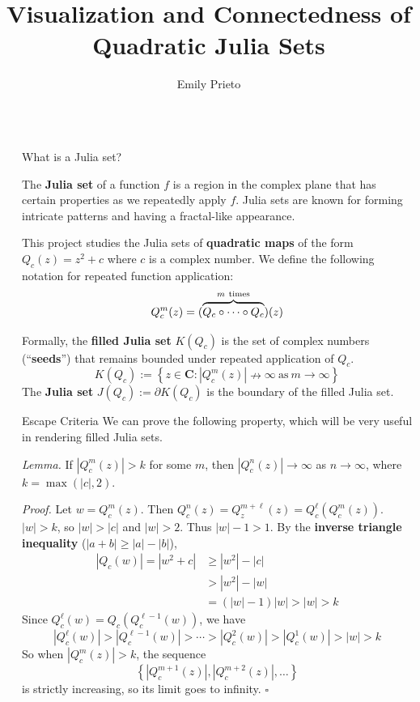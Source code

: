 \documentclass[final]{beamer}
\title{Visualization and Connectedness of %
Quadratic Julia Sets}
\author{Emily Prieto}
\newlength{\sepwidth}
\newlength{\colwidth}
\newcommand{\separatorcolumn}{\begin{column}{\sepwidth}\end{column}}
\newcommand{\setbold}{\mathbf}
\newcommand{\CC}{\setbold{C}}
\begin{document}
\begin{frame}[t]
\begin{columns}[t]
\separatorcolumn

\begin{column}{\colwidth}

	\begin{block}{What is a Julia set?}

		The \textbf{Julia set} of a function $f$ is a
		region in the complex plane that has certain
		properties as we repeatedly apply $f$.
		Julia sets are known for forming intricate
		patterns and having a fractal-like appearance.

		This project studies the Julia sets of
		\textbf{quadratic maps} of the form
		$Q_c(z) = z^2 + c$ where $c$ is a complex number.
		We define the following notation for repeated function application: \[
			Q_c^{m}(z) = (\overbrace{\vphantom{(}Q_c \circ \cdots \circ Q_c}^{m\ \text{times}})(z)
		\]

		Formally, the \textbf{filled Julia set} $K(Q_c)$
		is the set of complex numbers (``\textbf{seeds}'')
		that remains bounded
		under repeated application of $Q_c$. \[
			K(Q_c) := \left\{ z \in \CC : |Q_c^{m}(z)| \nrightarrow \infty\ \text{as}\ m \rightarrow \infty \right\}
		\]
		The \textbf{Julia set} $J(Q_c) := \partial{} K(Q_c)$ is the boundary
		of the filled Julia set.

	\end{block}

	\begin{alertblock}{Escape Criteria}
		We can prove the following property, which will
		be very useful in rendering filled Julia sets.

		\textit{Lemma.}
		If $|Q_c^{m}(z)| > k$
		for some $m$, then $|Q_c^{n}(z)| \rightarrow \infty$ as $n \rightarrow \infty$,
		where $k = \max(|c|, 2)$.

		\textit{Proof.}
		Let $w = Q_c^{m}(z)$. Then $Q_c^{n}(z) = Q_z^{m + \ell}(z) = Q_c^{\ell}(Q_c^{m}(z))$.
		$|w| > k$, so $|w| > |c|$ and $|w| > 2$. Thus $|w| - 1 > 1$.
		By the \textbf{inverse triangle inequality} ($|a + b| \ge |a| - |b|$),
		\begin{align*}
			|Q_c(w)| = |w^2 + c| &\ge |w^2| - |c| \\
								 &> |w^2| - |w| \\
								 &= (|w| - 1)|w| > |w| > k
		\end{align*}
		Since $Q_c^{\ell}(w) = Q_c(Q_c^{\ell - 1}(w))$, we have \[
			|Q_c^{\ell}(w)| > |Q_c^{\ell - 1}(w)| > \cdots > |Q_c^{2}(w)| >|Q_c^{1}(w)| > |w| > k
		\]
		So when $|Q_c^{m}(z)| > k$, the sequence \[
			\left\{ |Q_c^{m + 1}(z)|, |Q_c^{m + 2}(z)|, \ldots \right\}
		\] is strictly increasing, so its limit goes to infinity. \hfill $\square$




\end{alertblock}
\end{column}
\end{columns}
\end{frame}
\end{document}
